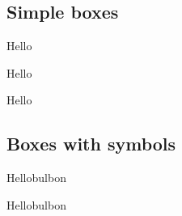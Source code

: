 \lipsum[1]

\subsection{Simple boxes}

\begin{tblslineshorizontal}{Hello}
\lipsum[2]
\end{tblslineshorizontal}

\begin{tblsfilled}{Hello}
\lipsum[2]
\end{tblsfilled}

\begin{tblsframed}{Hello}
\lipsum[2]
\end{tblsframed}

\subsection{Boxes with symbols}

\begin{tblsfilledsymbol}{Hello}{bulbon}
\lipsum[24-30]
\end{tblsfilledsymbol}

\begin{tblsframedsymbol}{Hello}{bulbon}
\lipsum[24-30]
\end{tblsframedsymbol}
